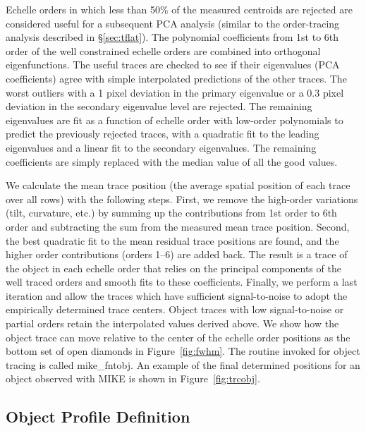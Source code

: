 \documentclass[12pt,preprint]{aastex}
\begin{document}
Echelle orders in which less than 50\% of the measured centroids 
are rejected are considered useful for a subsequent PCA analysis (similar
to the order-tracing analysis described in  \S\ref{sec:tflat}). 
The polynomial coefficients from 1st to 6th order of the well
constrained echelle orders are combined into orthogonal eigenfunctions.
The useful traces are checked to see if their eigenvalues 
(PCA coefficients) agree with simple interpolated predictions of the 
other traces.  The worst outliers with a 1 pixel deviation in the primary 
eigenvalue or a 0.3 pixel deviation in the secondary eigenvalue level are 
rejected.  The remaining eigenvalues are fit as a function of 
echelle order with low-order polynomials to
predict the previously rejected traces, with a quadratic fit to the leading
eigenvalues and a linear fit to the secondary eigenvalues.  The remaining
coefficients are simply replaced with the median value of all the good 
values.   

We calculate the mean trace position (the average spatial position
of each trace over all rows) with the following steps.  First, we remove the
high-order variations (tilt, curvature, etc.) by summing up the contributions
from 1st order to 6th order and subtracting the sum from the measured mean
trace position.  Second, the best quadratic fit to the mean residual trace 
positions are found, and the higher order contributions (orders 1--6) are
added back.  The result is a trace of the object in each echelle order
that relies on the principal components of the well traced orders and
smooth fits to these coefficients.  Finally, we perform a last iteration and
allow the traces which have sufficient signal-to-noise to adopt the 
empirically determined trace centers.  Object traces with low 
signal-to-noise or partial orders retain the interpolated values derived above.
We show how the object trace can
move relative to the center of the echelle order positions 
as the bottom set of open diamonds in Figure~\ref{fig:fwhm}.
The routine invoked for object tracing is called mike\_fntobj.
An example of the final determined positions for an object observed with
MIKE is shown in Figure~\ref{fig:trcobj}.  

\subsection{Object Profile Definition}
\end{document}
